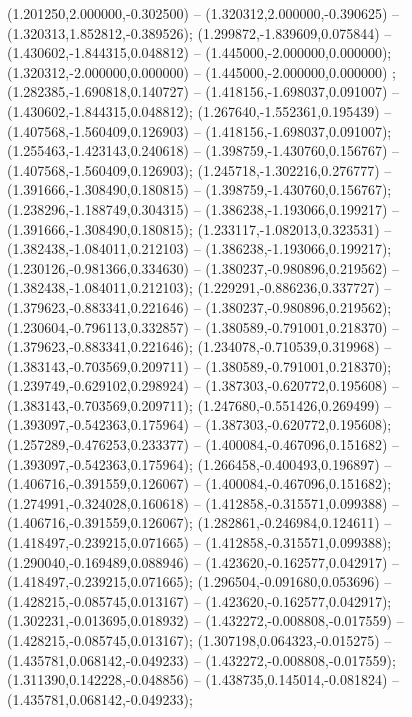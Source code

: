  (1.201250,2.000000,-0.302500) -- (1.320312,2.000000,-0.390625) -- (1.320313,1.852812,-0.389526);
 (1.299872,-1.839609,0.075844) -- (1.430602,-1.844315,0.048812) -- (1.445000,-2.000000,0.000000);
 (1.320312,-2.000000,0.000000) -- (1.445000,-2.000000,0.000000) ;
 (1.282385,-1.690818,0.140727) -- (1.418156,-1.698037,0.091007) -- (1.430602,-1.844315,0.048812);
 (1.267640,-1.552361,0.195439) -- (1.407568,-1.560409,0.126903) -- (1.418156,-1.698037,0.091007);
 (1.255463,-1.423143,0.240618) -- (1.398759,-1.430760,0.156767) -- (1.407568,-1.560409,0.126903);
 (1.245718,-1.302216,0.276777) -- (1.391666,-1.308490,0.180815) -- (1.398759,-1.430760,0.156767);
 (1.238296,-1.188749,0.304315) -- (1.386238,-1.193066,0.199217) -- (1.391666,-1.308490,0.180815);
 (1.233117,-1.082013,0.323531) -- (1.382438,-1.084011,0.212103) -- (1.386238,-1.193066,0.199217);
 (1.230126,-0.981366,0.334630) -- (1.380237,-0.980896,0.219562) -- (1.382438,-1.084011,0.212103);
 (1.229291,-0.886236,0.337727) -- (1.379623,-0.883341,0.221646) -- (1.380237,-0.980896,0.219562);
 (1.230604,-0.796113,0.332857) -- (1.380589,-0.791001,0.218370) -- (1.379623,-0.883341,0.221646);
 (1.234078,-0.710539,0.319968) -- (1.383143,-0.703569,0.209711) -- (1.380589,-0.791001,0.218370);
 (1.239749,-0.629102,0.298924) -- (1.387303,-0.620772,0.195608) -- (1.383143,-0.703569,0.209711);
 (1.247680,-0.551426,0.269499) -- (1.393097,-0.542363,0.175964) -- (1.387303,-0.620772,0.195608);
 (1.257289,-0.476253,0.233377) -- (1.400084,-0.467096,0.151682) -- (1.393097,-0.542363,0.175964);
 (1.266458,-0.400493,0.196897) -- (1.406716,-0.391559,0.126067) -- (1.400084,-0.467096,0.151682);
 (1.274991,-0.324028,0.160618) -- (1.412858,-0.315571,0.099388) -- (1.406716,-0.391559,0.126067);
 (1.282861,-0.246984,0.124611) -- (1.418497,-0.239215,0.071665) -- (1.412858,-0.315571,0.099388);
 (1.290040,-0.169489,0.088946) -- (1.423620,-0.162577,0.042917) -- (1.418497,-0.239215,0.071665);
 (1.296504,-0.091680,0.053696) -- (1.428215,-0.085745,0.013167) -- (1.423620,-0.162577,0.042917);
 (1.302231,-0.013695,0.018932) -- (1.432272,-0.008808,-0.017559) -- (1.428215,-0.085745,0.013167);
 (1.307198,0.064323,-0.015275) -- (1.435781,0.068142,-0.049233) -- (1.432272,-0.008808,-0.017559);
 (1.311390,0.142228,-0.048856) -- (1.438735,0.145014,-0.081824) -- (1.435781,0.068142,-0.049233);
